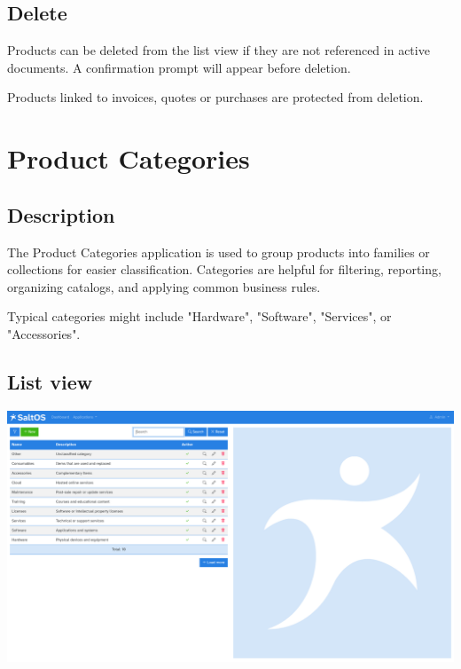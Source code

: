 \documentclass[a4paper]{article}
\begin{document}
\hypertarget{toc155}{}
\subsection{Delete}

Products can be deleted from the list view if they are not referenced in active documents.
A confirmation prompt will appear before deletion.

Products linked to invoices, quotes or purchases are protected from deletion.


\hypertarget{toc156}{}
\section{Product Categories}

\hypertarget{toc157}{}
\subsection{Description}

The Product Categories application is used to group products into families or collections for easier classification.
Categories are helpful for filtering, reporting, organizing catalogs, and applying common business rules.

Typical categories might include "Hardware", "Software", "Services", or "Accessories".

\hypertarget{toc158}{}
\subsection{List view}

\begin{center}\includegraphics[width=1\textwidth]{../ujest/snaps/test-screenshots-js-screenshots-sales-products-categories-list-en-us-1-snap.png}\end{center}
\end{document}
